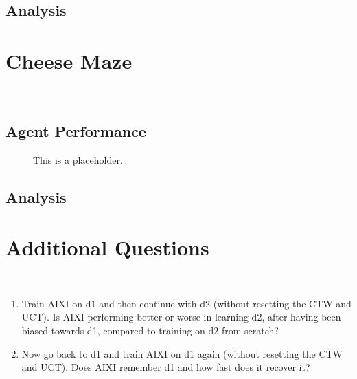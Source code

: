 \subsection{Analysis}

\section{Cheese Maze}\
\label{sec:cheese_maze}
\subsection{Agent Performance} 


\begin{figure}[!hbtp]
  \label{fig:cost}
  \makebox[\textwidth]{\framebox[5cm]{\rule{0pt}{5cm}}}
\caption{This is a placeholder.{\label{cheese_maze_performance}}}
  



\end{figure}


\subsection{Analysis}


\section{Additional Questions}\
\label{sec:cheese_maze}
\begin{enumerate}
\item
Train AIXI on d1 and then continue with d2 (without resetting the CTW and UCT). Is AIXI performing better or worse in learning d2, after having been biased towards d1, compared to training on d2 from scratch?

\item
Now go back to d1 and train AIXI on d1 again (without resetting the CTW and UCT). Does AIXI remember d1 and how fast does it recover it?
\end{enumerate}





